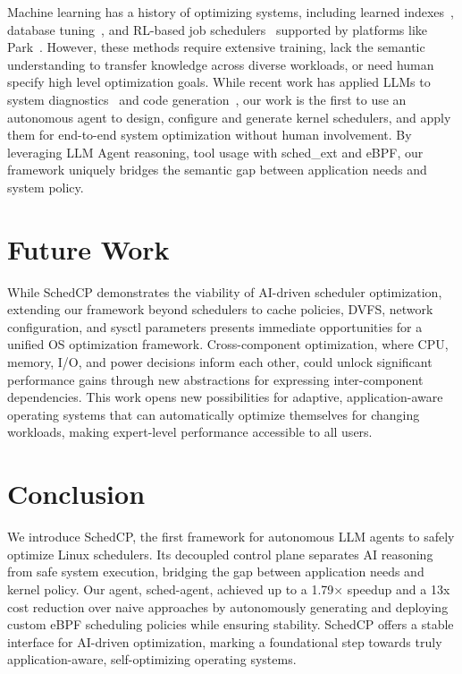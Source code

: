 \documentclass[preprint]{article}
\newcommand{\sys}{SchedCP\xspace}
\newcommand{\agent}{sched-agent\xspace}
\begin{document}
Machine learning has a history of optimizing systems, including learned indexes~\cite{kraska2018learned}, database tuning~\cite{marcus2019neo,vanaken2017ottertune}, and RL-based job schedulers~\cite{mao2019decima,qiu2020firm,zhang2024mrsch} supported by platforms like Park~\cite{mao2019park}. However, these methods require extensive training, lack the semantic understanding to transfer knowledge across diverse workloads, or need human specify high level optimization goals. While recent work has applied LLMs to system diagnostics~\cite{wang2024llmsys} and  code generation~\cite{wei2024mapper,10.1145/3672197.3673434}, our work is the first to use an autonomous agent to design, configure and generate kernel schedulers, and apply them for end-to-end system optimization without human involvement. By leveraging LLM Agent reasoning, tool usage with sched\_ext and eBPF, our framework uniquely bridges the semantic gap between application needs and system policy.
\section{Future Work}
\label{sec:future}

While \sys demonstrates the viability of AI-driven scheduler optimization, extending our framework beyond schedulers to cache policies, DVFS, network configuration, and sysctl parameters presents immediate opportunities for a unified OS optimization framework. Cross-component optimization, where CPU, memory, I/O, and power decisions inform each other, could unlock significant performance gains through new abstractions for expressing inter-component dependencies. This work opens new possibilities for adaptive, application-aware operating systems that can automatically optimize themselves for changing workloads, making expert-level performance accessible to all users.
\section{Conclusion}
\label{sec:conclusion}

We introduce \sys, the first framework for autonomous LLM agents to safely optimize Linux schedulers. Its decoupled control plane separates AI reasoning from safe system execution, bridging the gap between application needs and kernel policy. Our agent, \agent, achieved up to a 1.79× speedup and a 13x cost reduction over naive approaches by autonomously generating and deploying custom eBPF scheduling policies while ensuring stability. SchedCP offers a stable interface for AI-driven optimization, marking a foundational step towards truly application-aware, self-optimizing operating systems.




\end{document}
